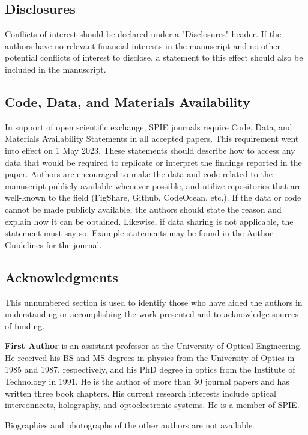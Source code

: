 \documentclass[12pt]{spieman}  %
\begin{document}

\subsection*{Disclosures}
Conflicts of interest should be declared under a "Disclosures" header. If the authors have no relevant financial interests in the manuscript and no other potential conflicts of interest to disclose, a statement to this effect should also be included in the manuscript.


\subsection* {Code, Data, and Materials Availability} 
In support of open scientific exchange, SPIE journals require Code, Data, and Materials Availability Statements in all accepted papers. This requirement went into effect on 1 May 2023. These statements should describe how to access any data that would be required to replicate or interpret the findings reported in the paper. Authors are encouraged to make the data and code related to the manuscript publicly available whenever possible, and utilize repositories that are well-known to the field (FigShare, Github, CodeOcean, etc.). If the data or code cannot be made publicly available, the authors should state the reason and explain how it can be obtained. Likewise, if data sharing is not applicable, the statement must say so. Example statements may be found in the Author Guidelines for the journal.


\subsection* {Acknowledgments}
This unnumbered section is used to identify those who have aided the authors in understanding or accomplishing the work presented and to acknowledge sources of funding. 





\vspace{2ex}\noindent\textbf{First Author} is an assistant professor at the University of Optical Engineering. He received his BS and MS degrees in physics from the University of Optics in 1985 and 1987, respectively, and his PhD degree in optics from the Institute of Technology in 1991.  He is the author of more than 50 journal papers and has written three book chapters. His current research interests include optical interconnects, holography, and optoelectronic systems. He is a member of SPIE.

\vspace{1ex}
\noindent Biographies and photographs of the other authors are not available.

\listoffigures
\listoftables

\end{document}
